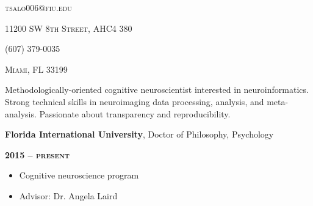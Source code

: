 \documentclass[10pt]{article}
\date{}
\newcommand{\namestyle}{\Huge \fontfamily{pcr}\selectfont}
\newcommand{\iconstyle}{\LARGE}
\newcommand{\headstyle}{\scshape \normalsize \textcolor{light-gray}}
\newcommand{\sectionstyle}{\LARGE \fontfamily{pcr}\selectfont}
\begin{document}
\begin{center}
	\namestyle{TAYLOR SALO}

	\bigskip

	\iconstyle{\href{https://github.com/tsalo}{\faGithubSquare}}
	\enspace
	\iconstyle{\href{https://www.researchgate.net/profile/Taylor_Salo}{}}
	\enspace
	\iconstyle{\href{https://scholar.google.com/citations?user=YbH1akIAAAAJ}{}}
	\enspace
	\iconstyle{\href{https://osf.io/iwpvm/}{}}
\end{center}

\begin{minipage}[t]{.5\linewidth}
\flushleft
\headstyle{tsalo006@fiu.edu}
\end{minipage}
\hfill
\begin{minipage}[t]{.5\linewidth}
\flushright
\headstyle{11200 SW 8th Street, AHC4 380}
\end{minipage}

\begin{minipage}[t]{.3\linewidth}
\flushleft
\headstyle{(607) 379-0035}
\end{minipage}
\hfill
\begin{minipage}[t]{.7\linewidth}
\flushright
\headstyle{Miami, FL 33199}
\end{minipage}

\bigskip

\begin{center}\sectionstyle{PROFILE}\end{center}

Methodologically-oriented cognitive neuroscientist interested in
neuroinformatics. Strong technical skills in neuroimaging data
processing, analysis, and meta-analysis. Passionate about transparency
and reproducibility.

\bigskip

\begin{center}\sectionstyle{EDUCATION}\end{center}

\begin{minipage}[t]{.7\linewidth}
\flushleft
\noindent
\textbf{Florida International University}, Doctor of Philosophy,
Psychology
\end{minipage}
\hfill
\begin{minipage}[t]{.3\linewidth}
\flushright
\noindent
\textsc{\textbf{2015 -- present}}
\end{minipage}

\begin{itemize}[noitemsep, nolistsep]
\item
  Cognitive neuroscience program
\item
  Advisor: Dr. Angela Laird
\end{itemize}
\end{document}
